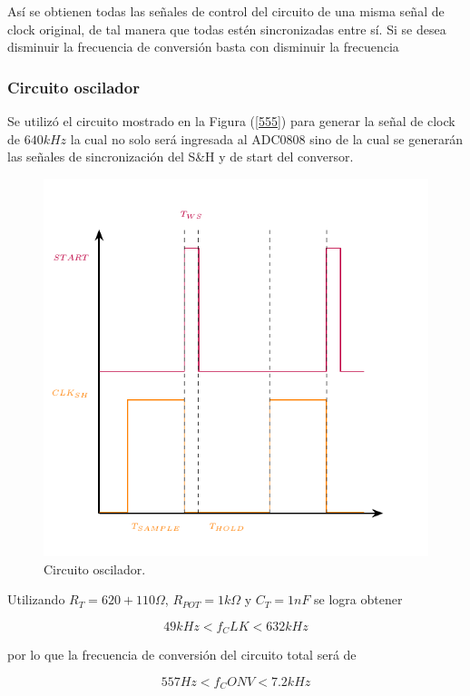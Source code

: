 Así se obtienen todas las señales de control del circuito de una misma señal de clock original, de tal manera que todas estén sincronizadas entre sí. Si se desea disminuir la frecuencia de conversión basta con disminuir la frecuencia 

\subsubsection{Circuito oscilador}

Se utilizó el circuito mostrado en la Figura (\ref{555}) para generar la señal de clock de $640kHz$ la cual no solo será ingresada al ADC0808 sino de la cual se generarán las señales de sincronización del S\&H y de start del conversor.

\begin{figure}[H]
\centering
\includegraphics[width=0.8\linewidth]{ImagenesEjercicio1/Graficos.pdf}
\caption{Circuito oscilador.}
\label{START}
\end{figure}

Utilizando $R_{T} = 620 + 110\Omega$, $R_{POT} = 1k\Omega$ y $C_{T} = 1nF$ se logra obtener

\[ 49kHz < f_CLK < 632kHz\]

por lo que la frecuencia de conversión del circuito total será de

\[ 557Hz < f_CONV < 7.2kHz \]

